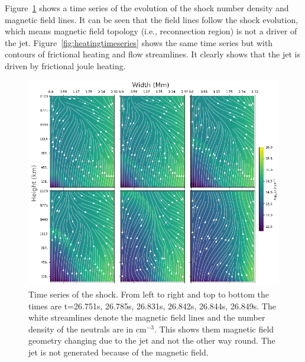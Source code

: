 \documentclass[12pt,upcase]{umlthesis}
\begin{document}
Figure~\ref{fig:spiculetimeseries} shows a time series of the evolution of the shock number density and magnetic field lines. It can be seen that the field lines follow the shock evolution, which means magnetic field topology (i.e., reconnection region) is not a driver of the jet. Figure~\ref{fig:heatingtimeseries} shows the same time series but with contours of frictional heating and flow streamlines. It clearly shows that the jet is driven by frictional joule heating.

\begin{figure}[ht!]
	\centering
    \includegraphics[width=1\textwidth]{images/spiculetimeseries.eps}
    \caption{Time series of the shock. From left to right and top to bottom the times are t=26.751s, 26.785s, 26.831s, 26.842s, 26.844s, 26.849s. The white streamlines denote the magnetic field lines and the number density of the neutrals are in cm$^{-3}$. This shows them magnetic field geometry changing due to the jet and not the other way round. The jet is not generated because of the magnetic field.}\label{fig:spiculetimeseries}
\end{figure}
\end{document}
